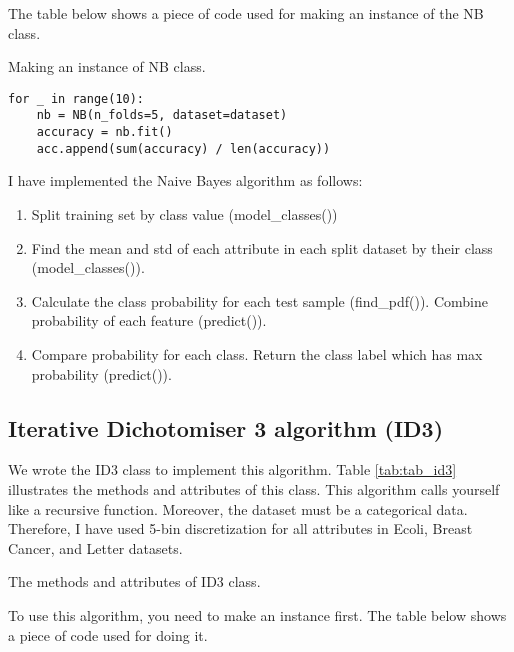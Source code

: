 The table below shows a piece of code used for making an instance of the NB class.

\begin{table}[H]
\centering
\caption{Making an instance of NB class.}
\begin{lstlisting}
for _ in range(10):
    nb = NB(n_folds=5, dataset=dataset)
    accuracy = nb.fit()
    acc.append(sum(accuracy) / len(accuracy))
\end{lstlisting}
\end{table}


I have implemented the Naive Bayes algorithm as follows:
\begin{enumerate}
    \item Split training set by class value (model\_classes())
    \item Find the mean and std of each attribute in each split dataset by their class (model\_classes()).
    \item Calculate the class probability for each test sample (find\_pdf()). Combine probability of each feature (predict()).
    \item Compare probability for each class. Return the class label which has max probability (predict()).
    
\end{enumerate}















\subsection{Iterative Dichotomiser 3 algorithm (ID3)}
We wrote the ID3 class to implement this algorithm.  Table \ref{tab:tab_id3} illustrates the methods and attributes of this class. This algorithm calls yourself like a recursive function. Moreover, the dataset must be a categorical data. Therefore, I have used 5-bin discretization for all attributes in Ecoli, Breast Cancer, and Letter datasets.

\begin{table}[H]
\centering
\caption{The methods and attributes of ID3 class.}
\label{tab:tab_id3}

\end{table}
To use this algorithm, you need to make an instance first. The table below shows a piece of code used for doing it.

